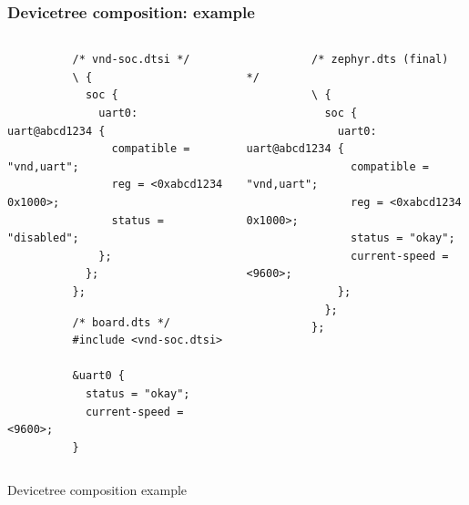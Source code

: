 \documentclass[handout]{beamer}
\begin{document}
\begin{frame}[fragile]
  \frametitle{Devicetree composition: example}

  \begin{listing}[H]
    \begin{columns}
      \begin{column}{0.5\textwidth}
        \begin{verbatim}
          /* vnd-soc.dtsi */
          \ {
            soc {
              uart0: uart@abcd1234 {
                compatible = "vnd,uart";
                reg = <0xabcd1234 0x1000>;
                status = "disabled";
              };
            };
          };
        \end{verbatim}
        \begin{verbatim}
          /* board.dts */
          #include <vnd-soc.dtsi>

          &uart0 {
            status = "okay";
            current-speed = <9600>;
          }
        \end{verbatim}
      \end{column}
      \begin{column}{0.5\textwidth}
        \begin{verbatim}
          /* zephyr.dts (final) */
          \ {
            soc {
              uart0: uart@abcd1234 {
                compatible = "vnd,uart";
                reg = <0xabcd1234 0x1000>;
                status = "okay";
                current-speed = <9600>;
              };
            };
          };
        \end{verbatim}
      \end{column}
    \end{columns}
    \caption{Devicetree composition example}
  \end{listing}

\end{frame}
\end{document}
